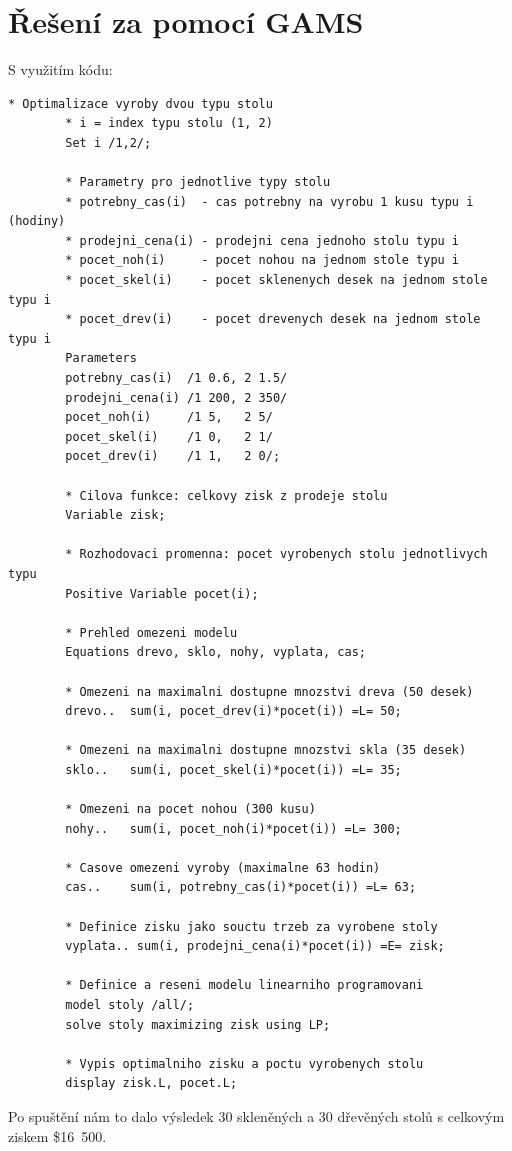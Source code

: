 \documentclass[../sablona-main.tex]{subfiles}
\begin{document}
	\section{Řešení za pomocí GAMS}
	S využitím kódu:
	\begin{lstlisting}[caption={Model optimalizace výroby stolů}, label={lst:gams_model}]
		* Optimalizace vyroby dvou typu stolu
		* i = index typu stolu (1, 2)
		Set i /1,2/;
		
		* Parametry pro jednotlive typy stolu
		* potrebny_cas(i)  - cas potrebny na vyrobu 1 kusu typu i (hodiny)
		* prodejni_cena(i) - prodejni cena jednoho stolu typu i
		* pocet_noh(i)     - pocet nohou na jednom stole typu i
		* pocet_skel(i)    - pocet sklenenych desek na jednom stole typu i
		* pocet_drev(i)    - pocet drevenych desek na jednom stole typu i
		Parameters 
		potrebny_cas(i)  /1 0.6, 2 1.5/
		prodejni_cena(i) /1 200, 2 350/
		pocet_noh(i)     /1 5,   2 5/
		pocet_skel(i)    /1 0,   2 1/
		pocet_drev(i)    /1 1,   2 0/;
		
		* Cilova funkce: celkovy zisk z prodeje stolu
		Variable zisk;
		
		* Rozhodovaci promenna: pocet vyrobenych stolu jednotlivych typu
		Positive Variable pocet(i);
		
		* Prehled omezeni modelu
		Equations drevo, sklo, nohy, vyplata, cas;
		
		* Omezeni na maximalni dostupne mnozstvi dreva (50 desek)
		drevo..  sum(i, pocet_drev(i)*pocet(i)) =L= 50;
		
		* Omezeni na maximalni dostupne mnozstvi skla (35 desek)
		sklo..   sum(i, pocet_skel(i)*pocet(i)) =L= 35;
		
		* Omezeni na pocet nohou (300 kusu)
		nohy..   sum(i, pocet_noh(i)*pocet(i)) =L= 300;
		
		* Casove omezeni vyroby (maximalne 63 hodin)
		cas..    sum(i, potrebny_cas(i)*pocet(i)) =L= 63;
		
		* Definice zisku jako souctu trzeb za vyrobene stoly
		vyplata.. sum(i, prodejni_cena(i)*pocet(i)) =E= zisk;
		
		* Definice a reseni modelu linearniho programovani
		model stoly /all/;
		solve stoly maximizing zisk using LP;
		
		* Vypis optimalniho zisku a poctu vyrobenych stolu
		display zisk.L, pocet.L;
	\end{lstlisting} 
	
	Po spuštění nám to dalo výsledek 30 skleněných a 30 dřevěných stolů s celkovým ziskem \$16~500.
\end{document}
